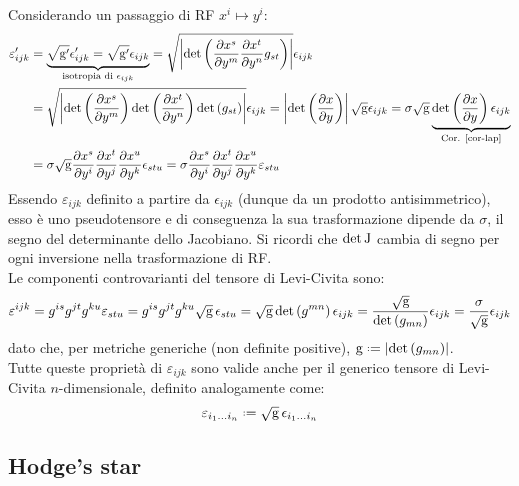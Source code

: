 Considerando un passaggio di RF $ x^i \mapsto y^i $:
\begin{equation*}
	\begin{split}
		\varepsilon'_{ijk} &= \underbrace{\sqrt{\mathrm{g}'} \epsilon'_{ijk} = \sqrt{\mathrm{g}'} \epsilon_{ijk}}_{\text{isotropia di }\epsilon_{ijk}} = \sqrt{\left\lvert \det \left( \frac{\partial x^s}{\partial y^m} \frac{\partial x^t}{\partial y^n} g_{st} \right) \right\rvert} \epsilon_{ijk}\\
				   &= \sqrt{\left\lvert \det \left( \frac{\partial x^s}{\partial y^m} \right) \det \left( \frac{\partial x^t}{\partial y^n} \right) \det \left( g_{st} \right) \right\rvert} \epsilon_{ijk} = \left\lvert\det \left( \frac{\partial x}{\partial y} \right)\right\rvert \sqrt{\mathrm{g}} \epsilon_{ijk} = \sigma \sqrt{\mathrm{g}} \underbrace{\det \left( \frac{\partial x}{\partial y} \right) \epsilon_{ijk}}_{\text{Cor. \ref{cor-lap}}}\\
				   &= \sigma \sqrt{\mathrm{g}} \frac{\partial x^s}{\partial y^i} \frac{\partial x^t}{\partial y^j} \frac{\partial x^u}{\partial y^k} \epsilon_{stu} = \sigma \frac{\partial x^s}{\partial y^i} \frac{\partial x^t}{\partial y^j} \frac{\partial x^u}{\partial y^k} \varepsilon_{stu}
	\end{split}
\end{equation*}
Essendo $ \varepsilon_{ijk} $ definito a partire da $ \epsilon_{ijk} $ (dunque da un prodotto antisimmetrico), esso è uno pseudotensore e di conseguenza la sua trasformazione dipende da $ \sigma $, il segno del determinante dello Jacobiano. Si ricordi che $ \det\mathrm{J} $ cambia di segno per ogni inversione nella trasformazione di RF.\\
Le componenti controvarianti del tensore di Levi-Civita sono:
\begin{equation}
	\varepsilon^{ijk} = g^{is} g^{jt} g^{ku} \varepsilon_{stu} = g^{is} g^{jt} g^{ku} \sqrt{\mathrm{g}}\, \epsilon_{stu} = \sqrt{\mathrm{g}} \det \left( g^{mn} \right) \epsilon_{ijk} = \frac{\sqrt{\mathrm{g}}}{\det \left( g_{mn} \right)} \epsilon_{ijk} = \frac{\sigma}{\sqrt{\mathrm{g}}} \epsilon_{ijk}
	\label{eq:3.16}
\end{equation}
dato che, per metriche generiche (non definite positive), $ \tens{g} \defeq \abs{\det \left( g_{mn} \right)} $.\\
Tutte queste proprietà di $ \varepsilon_{ijk} $ sono valide anche per il generico tensore di Levi-Civita $ n $-dimensionale, definito analogamente come:
\begin{equation}
	\varepsilon_{i_1 \dots i_n} \defeq \sqg \, \epsilon_{i_1 \dots i_n}
	\label{eq:3.17}
\end{equation}

\subsection{Hodge's star}

